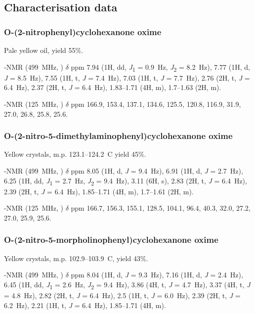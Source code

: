 \begin{refsection}
\subsection{Characterisation data}

\subsubsection{O-(2-nitrophenyl)cyclohexanone oxime }

Pale yellow oil, yield 55\%.

-NMR (499~MHz, ) $\delta$ ppm 7.94 (1H, dd, \textit{J}\textsubscript{1} = 0.9~Hz, \textit{J}\textsubscript{2} = 8.2~Hz), 7.77 (1H, d, \textit{J} = 8.5~Hz), 7.55 (1H, t, \textit{J} = 7.4~Hz), 7.03 (1H, t, \textit{J} = 7.7~Hz), 2.76 (2H, t, \textit{J} = 6.4~Hz), 2.37 (2H, t, \textit{J} = 6.4~Hz), 1.83--1.71 (4H, m), 1.7--1.63 (2H, m).

-NMR (125~MHz, ) $\delta$ ppm 166.9, 153.4, 137.1, 134.6, 125.5, 120.8, 116.9, 31.9, 27.0, 26.8, 25.8, 25.6.

\subsubsection{O-(2-nitro-5-dimethylaminophenyl)cyclohexanone oxime }

Yellow crystals, m.p. 123.1--124.2~\degree{}C yield 45\%.

-NMR (499~MHz, ) $\delta$ ppm 8.05 (1H, d, \textit{J} = 9.4~Hz), 6.91 (1H, d, \textit{J} = 2.7~Hz), 6.25 (1H, dd, \textit{J}\textsubscript{1} = 2.7~Hz, \textit{J}\textsubscript{2} = 9.4~Hz), 3.11 (6H, s), 2.83 (2H, t, \textit{J} = 6.4~Hz), 2.39 (2H, t, \textit{J} = 6.4~Hz), 1.85--1.71 (4H, m), 1.7--1.61 (2H, m).

-NMR (125~MHz, ) $\delta$ ppm 166.7, 156.3, 155.1, 128.5, 104.1, 96.4, 40.3, 32.0, 27.2, 27.0, 25.9, 25.6.

\subsubsection{O-(2-nitro-5-morpholinophenyl)cyclohexanone oxime }

Yellow crystals, m.p. 102.9--103.9~\degree{}C, yield 43\%.

-NMR (499~MHz, ) $\delta$ ppm 8.04 (1H, d, \textit{J} = 9.3~Hz), 7.16 (1H, d, \textit{J} = 2.4~Hz), 6.45 (1H, dd, \textit{J}\textsubscript{1} = 2.6~Hz, \textit{J}\textsubscript{2} = 9.4~Hz), 3.86 (4H, t, \textit{J} = 4.7~Hz), 3.37 (4H, t, \textit{J} = 4.8~Hz), 2.82 (2H, t, \textit{J} = 6.4~Hz), 2.5 (1H, t, \textit{J} = 6.0~Hz), 2.39 (2H, t, \textit{J} = 6.2~Hz), 2.21 (1H, t, \textit{J} = 6.4~Hz), 1.85--1.71 (4H, m).


\end{refsection}
